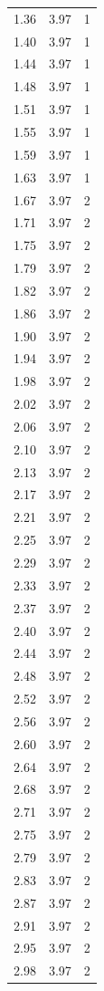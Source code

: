 \begin{longtable}{lrr}
  1.36 & 3.97 & 1 \\
  1.40 & 3.97 & 1 \\
  1.44 & 3.97 & 1 \\
  1.48 & 3.97 & 1 \\
  1.51 & 3.97 & 1 \\
  1.55 & 3.97 & 1 \\
  1.59 & 3.97 & 1 \\
  1.63 & 3.97 & 1 \\
  1.67 & 3.97 & 2 \\
  1.71 & 3.97 & 2 \\
  1.75 & 3.97 & 2 \\
  1.79 & 3.97 & 2 \\
  1.82 & 3.97 & 2 \\
  1.86 & 3.97 & 2 \\
  1.90 & 3.97 & 2 \\
  1.94 & 3.97 & 2 \\
  1.98 & 3.97 & 2 \\
  2.02 & 3.97 & 2 \\
  2.06 & 3.97 & 2 \\
  2.10 & 3.97 & 2 \\
  2.13 & 3.97 & 2 \\
  2.17 & 3.97 & 2 \\
  2.21 & 3.97 & 2 \\
  2.25 & 3.97 & 2 \\
  2.29 & 3.97 & 2 \\
  2.33 & 3.97 & 2 \\
  2.37 & 3.97 & 2 \\
  2.40 & 3.97 & 2 \\
  2.44 & 3.97 & 2 \\
  2.48 & 3.97 & 2 \\
  2.52 & 3.97 & 2 \\
  2.56 & 3.97 & 2 \\
  2.60 & 3.97 & 2 \\
  2.64 & 3.97 & 2 \\
  2.68 & 3.97 & 2 \\
  2.71 & 3.97 & 2 \\
  2.75 & 3.97 & 2 \\
  2.79 & 3.97 & 2 \\
  2.83 & 3.97 & 2 \\
  2.87 & 3.97 & 2 \\
  2.91 & 3.97 & 2 \\
  2.95 & 3.97 & 2 \\
  2.98 & 3.97 & 2 \\

\end{longtable}
